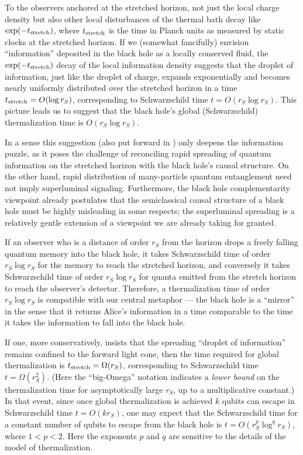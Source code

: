 \documentclass[12pt]{article}
\begin{document}
To the observers anchored at the stretched horizon, not just the local charge density but also other local disturbances of the thermal bath decay like $\exp(-t_{\rm stretch})$, where $t_{\rm stretch}$ is the time in Planck units as measured by static clocks at the stretched horizon. If we (somewhat fancifully) envision ``information'' deposited in the black hole as a locally conserved fluid, the $\exp(-t_{\rm stretch})$ decay of the local information density suggests that the droplet of information, just like the droplet of charge, expands exponentially and becomes nearly uniformly distributed over the stretched horizon in a time $t_{\rm stretch}=O(\log r_S)$, corresponding to Schwarzschild time $t=O(r_S\log r_S)$. This picture leads us to suggest that the black hole's global (Schwarzschild) thermalization time is $O(r_S\log r_S)$. 

In a sense this suggestion (also put forward in \cite{susskind-book}) only deepens the information puzzle, as it poses the challenge of reconciling rapid spreading of quantum information on the stretched horizon with the black hole's causal structure. On the other hand, rapid distribution of many-particle quantum entanglement need not imply superluminal signaling. Furthermore, the black hole complementarity viewpoint already postulates that the semiclassical causal structure of a black hole must be highly misleading in some respects; the superluminal spreading is a relatively gentle extension of a viewpoint we are already taking for granted.

If an observer who is a distance of order $r_S$ from the horizon drops a freely falling quantum memory into the black hole, it takes Schwarzschild time of order $r_S\log r_S$ for the memory to reach the stretched horizon, and conversely it takes Schwarzschild time of order $r_S\log r_S$ for quanta emitted from the stretch horizon to reach the observer's detector. Therefore, a thermalization time of order $r_S\log r_S$ is compatible with our central metaphor --- the black hole is a ``mirror'' in the sense that it returns Alice's information in a time comparable to the time it takes the information to fall into the black hole.

If one, more conservatively, insists that the spreading ``droplet of information'' remains confined to the forward light cone, then the time required for global thermalization is $t_{\rm stretch}=\Omega(r_S)$, corresponding to Schwarzschild time $t=\Omega(r_S^2)$. (Here the ``big-Omega'' notation indicates a {\em lower bound} on the thermalization time for asymptotically large $r_S$, up to a multiplicative constant.) In that event, since once global thermalization is achieved $k$ qubits can escape in Schwarzschild time $t=O(kr_S)$, one may expect that the Schwarzschild time for a constant number of qubits to escape from the black hole is $t=O(r_S^p\log^q r_S)$, where $1 < p < 2$. Here the exponents $p$ and $q$ are sensitive to the details of the model of thermalization. 
\end{document}
